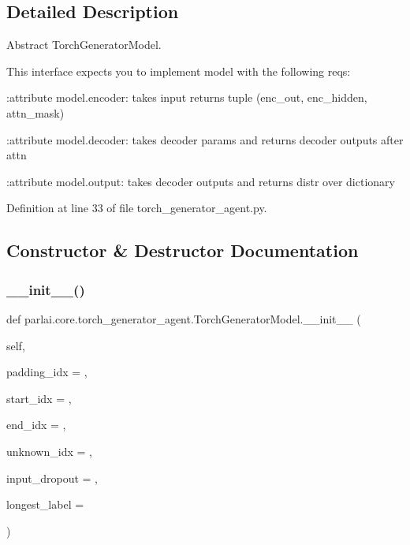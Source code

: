 \subsection{Detailed Description}
\begin{DoxyVerb}Abstract TorchGeneratorModel.

This interface expects you to implement model with the following reqs:

:attribute model.encoder:
    takes input returns tuple (enc_out, enc_hidden, attn_mask)

:attribute model.decoder:
    takes decoder params and returns decoder outputs after attn

:attribute model.output:
    takes decoder outputs and returns distr over dictionary
\end{DoxyVerb}
 

Definition at line 33 of file torch\+\_\+generator\+\_\+agent.\+py.



\subsection{Constructor \& Destructor Documentation}
\mbox{\label{classparlai_1_1core_1_1torch__generator__agent_1_1TorchGeneratorModel_aaec943d5add4e6d90fdd451f740be6af}} 
\subsubsection{\texorpdfstring{\+\_\+\+\_\+init\+\_\+\+\_\+()}{\_\_init\_\_()}}
{\footnotesize\ttfamily def parlai.\+core.\+torch\+\_\+generator\+\_\+agent.\+Torch\+Generator\+Model.\+\_\+\+\_\+init\+\_\+\+\_\+ (\begin{DoxyParamCaption}\item[{}]{self,  }\item[{}]{padding\+\_\+idx = {},  }\item[{}]{start\+\_\+idx = {},  }\item[{}]{end\+\_\+idx = {},  }\item[{}]{unknown\+\_\+idx = {},  }\item[{}]{input\+\_\+dropout = {},  }\item[{}]{longest\+\_\+label = {} }\end{DoxyParamCaption})}



